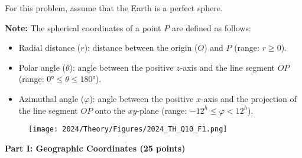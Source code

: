 For this problem, assume that the Earth is a perfect sphere.

\bigskip

\textbf{Note:} The spherical coordinates of a point $P$ are defined as follows:

\begin{itemize}
    \item Radial distance ($r$): distance between the origin ($O$) and $P$ (range: $r\geq 0$).

    \item Polar angle ($\theta$): angle between the positive $z$-axis and the line segment $OP$ (range: $\ang{0}\leq\theta\leq \ang{180}$).

    \item Azimuthal angle ($\varphi$): angle between the positive $x$-axis and the projection of the line segment $OP$ onto the $xy$-plane (range: $-12^h \leq \varphi < 12^h$).
\end{itemize}

\begin{figure}[H]
    \centering
    \texttt{[image: 2024/Theory/Figures/2024\_TH\_Q10\_F1.png]}
\end{figure}

\textbf{Part I: Geographic Coordinates (25 points)}

